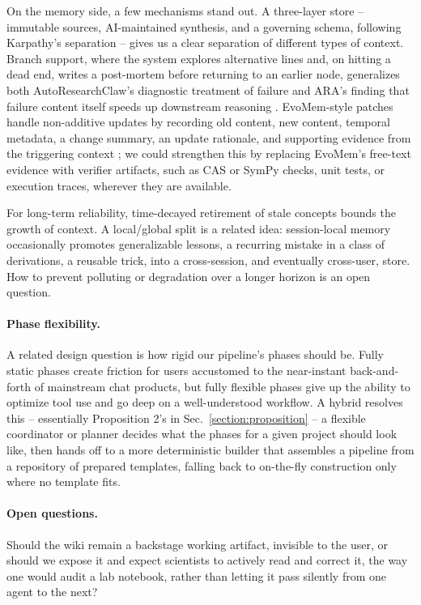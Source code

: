 On the memory side, a few mechanisms stand out. A three-layer store -- immutable sources, AI-maintained synthesis, and a governing schema, following Karpathy's separation \cite{karpathy2026llmwiki} -- gives us a clear separation of different types of context. Branch support, where the system explores alternative lines and, on hitting a dead end, writes a post-mortem before returning to an earlier node, generalizes both AutoResearchClaw's diagnostic treatment of failure \cite{2605.20025} and ARA's finding that failure content itself speeds up downstream reasoning \cite{2604.24658}. EvoMem-style patches handle non-additive updates by recording old content, new content, temporal metadata, a change summary, an update rationale, and supporting evidence from the triggering context \cite{2606.13681}; we could strengthen this by replacing EvoMem's free-text evidence with verifier artifacts, such as CAS or SymPy checks, unit tests, or execution traces, wherever they are available.

For long-term reliability, time-decayed retirement of stale concepts bounds the growth of context. A local/global split is a related idea: session-local memory occasionally promotes generalizable lessons, a recurring mistake in a class of derivations, a reusable trick, into a cross-session, and eventually cross-user, store. How to prevent polluting or degradation over a longer horizon is an open question.

\paragraph{Phase flexibility.}
A related design question is how rigid our pipeline's phases should be. Fully static phases create friction for users accustomed to the near-instant back-and-forth of mainstream chat products, but fully flexible phases give up the ability to optimize tool use and go deep on a well-understood workflow. A hybrid resolves this -- essentially Proposition 2's in Sec.\ \ref{section:proposition} -- a flexible coordinator or planner decides what the phases for a given project should look like, then hands off to a more deterministic builder that assembles a pipeline from a repository of prepared templates, falling back to on-the-fly construction only where no template fits.

\paragraph{Open questions.}
Should the wiki remain a backstage working artifact, invisible to the user, or should we expose it and expect scientists to actively read and correct it, the way one would audit a lab notebook, rather than letting it pass silently from one agent to the next?

